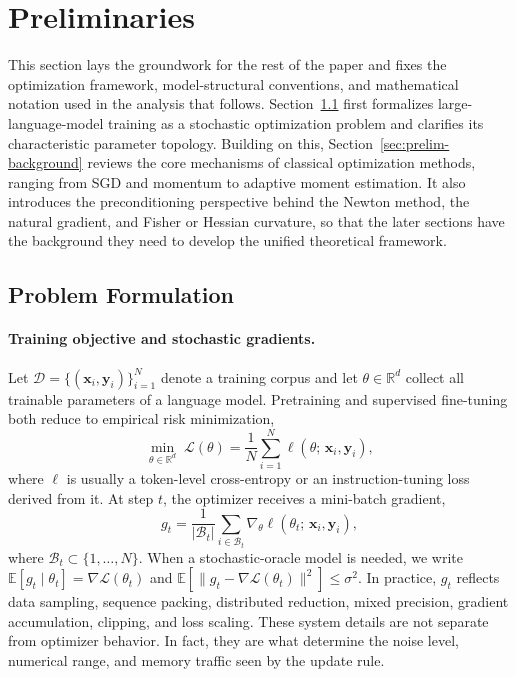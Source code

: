 \section{Preliminaries}
\label{sec:prelim}

This section lays the groundwork for the rest of the paper and fixes the
optimization framework, model-structural conventions, and mathematical notation
used in the analysis that follows.  Section~\ref{sec:prelim-formulation} first
formalizes large-language-model training as a stochastic optimization problem
and clarifies its characteristic parameter topology.  Building on this,
Section~\ref{sec:prelim-background} reviews the core mechanisms of classical
optimization methods, ranging from SGD and momentum to adaptive moment
estimation.  It also introduces the preconditioning perspective behind the
Newton method, the natural gradient, and Fisher or Hessian curvature, so that the
later sections have the background they need to develop the unified theoretical
framework.

\subsection{Problem Formulation}
\label{sec:prelim-formulation}

\paragraph{Training objective and stochastic gradients.}
Let $\mathcal{D}=\{(\mathbf{x}_i,\mathbf{y}_i)\}_{i=1}^N$ denote a training
corpus and let $\theta\in\mathbb{R}^d$ collect all trainable parameters of a
language model.  Pretraining and supervised fine-tuning both reduce to empirical
risk minimization,
\begin{equation}
  \min_{\theta\in\mathbb{R}^d}\;\mathcal{L}(\theta)
  = \frac{1}{N}\sum_{i=1}^{N}\ell(\theta;\,\mathbf{x}_i,\mathbf{y}_i),
  \label{eq:objective}
\end{equation}
where $\ell$ is usually a token-level cross-entropy or an instruction-tuning
loss derived from it. At step $t$, the optimizer receives a mini-batch
gradient,
\begin{equation}
  g_t = \frac{1}{|\mathcal{B}_t|}\sum_{i\in\mathcal{B}_t}
        \nabla_\theta\ell(\theta_t;\,\mathbf{x}_i,\mathbf{y}_i),
  \label{eq:mbgrad}
\end{equation}
where $\mathcal{B}_t\subset\{1,\ldots,N\}$.  When a stochastic-oracle model is
needed, we write $\mathbb{E}[g_t\mid\theta_t]=\nabla\mathcal{L}(\theta_t)$ and
$\mathbb{E}[\|g_t-\nabla\mathcal{L}(\theta_t)\|^2]\le\sigma^2$.  In practice,
$g_t$ reflects data sampling, sequence packing, distributed reduction, mixed
precision, gradient accumulation, clipping, and loss scaling.  These system
details are not separate from optimizer behavior.  In fact, they are what
determine the noise level, numerical range, and memory traffic seen by the
update rule.

